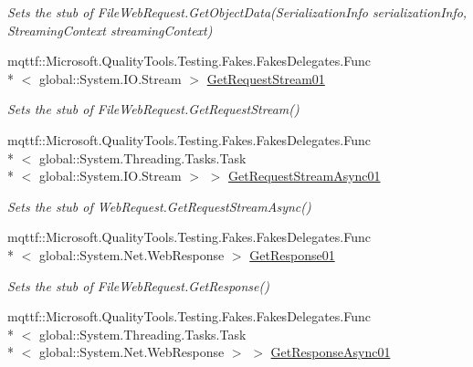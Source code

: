 \begin{DoxyCompactItemize}
\begin{DoxyCompactList}\small\item\em Sets the stub of File\-Web\-Request.\-Get\-Object\-Data(\-Serialization\-Info serialization\-Info, Streaming\-Context streaming\-Context)\end{DoxyCompactList}\item 
mqttf\-::\-Microsoft.\-Quality\-Tools.\-Testing.\-Fakes.\-Fakes\-Delegates.\-Func\\*
$<$ global\-::\-System.\-I\-O.\-Stream $>$ \hyperlink{class_system_1_1_net_1_1_fakes_1_1_stub_file_web_request_aafd3f1694faaba5984d7e0322e050ea0}{Get\-Request\-Stream01}
\begin{DoxyCompactList}\small\item\em Sets the stub of File\-Web\-Request.\-Get\-Request\-Stream()\end{DoxyCompactList}\item 
mqttf\-::\-Microsoft.\-Quality\-Tools.\-Testing.\-Fakes.\-Fakes\-Delegates.\-Func\\*
$<$ global\-::\-System.\-Threading.\-Tasks.\-Task\\*
$<$ global\-::\-System.\-I\-O.\-Stream $>$ $>$ \hyperlink{class_system_1_1_net_1_1_fakes_1_1_stub_file_web_request_a35c7c5cdf1c0ea35197c3db3ef3066fd}{Get\-Request\-Stream\-Async01}
\begin{DoxyCompactList}\small\item\em Sets the stub of Web\-Request.\-Get\-Request\-Stream\-Async()\end{DoxyCompactList}\item 
mqttf\-::\-Microsoft.\-Quality\-Tools.\-Testing.\-Fakes.\-Fakes\-Delegates.\-Func\\*
$<$ global\-::\-System.\-Net.\-Web\-Response $>$ \hyperlink{class_system_1_1_net_1_1_fakes_1_1_stub_file_web_request_a988e69b85c2369d6111cde447ac1ab4d}{Get\-Response01}
\begin{DoxyCompactList}\small\item\em Sets the stub of File\-Web\-Request.\-Get\-Response()\end{DoxyCompactList}\item 
mqttf\-::\-Microsoft.\-Quality\-Tools.\-Testing.\-Fakes.\-Fakes\-Delegates.\-Func\\*
$<$ global\-::\-System.\-Threading.\-Tasks.\-Task\\*
$<$ global\-::\-System.\-Net.\-Web\-Response $>$ $>$ \hyperlink{class_system_1_1_net_1_1_fakes_1_1_stub_file_web_request_a603ae8c31125fc3831b0323b0dfa95f3}{Get\-Response\-Async01}

\end{DoxyCompactItemize}
